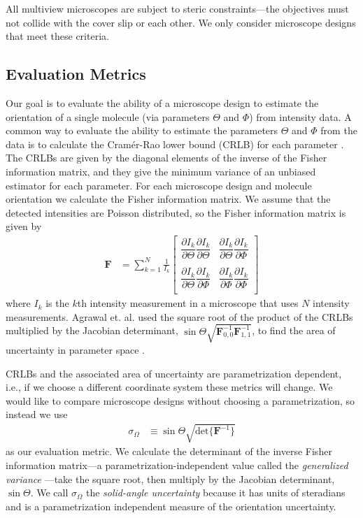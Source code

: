 \documentclass[10pt]{article}
\providecommand{\mb}[1]{\mathbf{#1}}
\begin{document}
All multiview microscopes are subject to steric constraints---the objectives
must not collide with the cover slip or each other. We only consider microscope
designs that meet these criteria.

\subsection{Evaluation Metrics}\label{metrics}
Our goal is to evaluate the ability of a microscope design to estimate the
orientation of a single molecule (via parameters $\Theta$ and $\Phi$) from
intensity data. A common way to evaluate the ability to estimate the parameters
$\Theta$ and $\Phi$ from the data is to calculate the Cram\'er-Rao lower bound
(CRLB) for each parameter \cite{kay1993}. The CRLBs are given by the diagonal
elements of the inverse of the Fisher information matrix, and they give the
minimum variance of an unbiased estimator for each parameter. For each
microscope design and molecule orientation we calculate the Fisher information
matrix. We assume that the detected intensities are Poisson distributed, so the
Fisher information matrix is given by
\begin{align}
  \mb{F} &= \sum_{k=1}^N \frac{1}{I_k}
  \begin{bmatrix}
    \dfrac{\partial I_k}{\partial \Theta}\dfrac{\partial I_k}{\partial \Theta}&\dfrac{\partial I_k}{\partial \Theta}\dfrac{\partial I_k}{\partial \Phi}\\\\
    \dfrac{\partial I_k}{\partial \Theta}\dfrac{\partial I_k}{\partial \Phi}&\dfrac{\partial I_k}{\partial \Phi}\dfrac{\partial I_k}{\partial \Phi}\\    
  \end{bmatrix}
\end{align}
where $I_k$ is the $k$th intensity measurement in a microscope that uses $N$
intensity measurements. Agrawal et. al. used the square root of the product of
the CRLBs multiplied by the Jacobian determinant,
$\sin\Theta\sqrt{\mb{F}^{-1}_{0,0}\mb{F}^{-1}_{1,1}}$, to find the area of
uncertainty in parameter space \cite{agrawal2012}.

CRLBs and the associated area of uncertainty are parametrization dependent,
i.e., if we choose a different coordinate system these metrics will change. We
would like to compare microscope designs without choosing a parametrization, so
instead we use
\begin{align}
  \sigma_{\Omega} &\equiv \sin\Theta\sqrt{\text{det}\{\mb{F}^{-1}\}}
\end{align}
as our evaluation metric. We calculate the determinant of the inverse Fisher
information matrix---a parametrization-independent value called the
\emph{generalized variance} \cite{anderson1958}---take the square root, then
multiply by the Jacobian determinant, $\sin\Theta$. We call $\sigma_{\Omega}$
the \emph{solid-angle uncertainty} because it has units of steradians and is a
parametrization independent measure of the orientation uncertainty.
\end{document}
